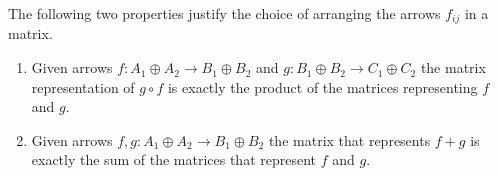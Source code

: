 \begin{remark}
  \label{remark:matrix_operations}
  The following two properties justify the choice of arranging the arrows \(f_{ij}\) in a matrix.
  \begin{enumerate}[label=(\arabic*)]
  \item Given arrows \(f\colon A_1\oplus A_2\to B_1\oplus B_2\) and \(g\colon B_1\oplus B_2\to C_1\oplus C_2\) the matrix representation of \(g\circ f\) is exactly the product of the matrices representing \(f\) and \(g\).
  \item Given arrows \(f,g\colon A_1\oplus A_2\to B_1\oplus B_2\) the matrix that represents \(f + g\) is exactly the sum of the matrices that represent \(f\) and \(g\).
  \end{enumerate}
\end{remark}

